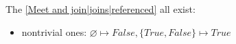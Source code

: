 The \ref{Meet and join|joins|referenced} all exist:
\begin{itemize}
  \item nontrivial ones: $\varnothing \mapsto False, \{True,False\}\mapsto True$
\end{itemize}